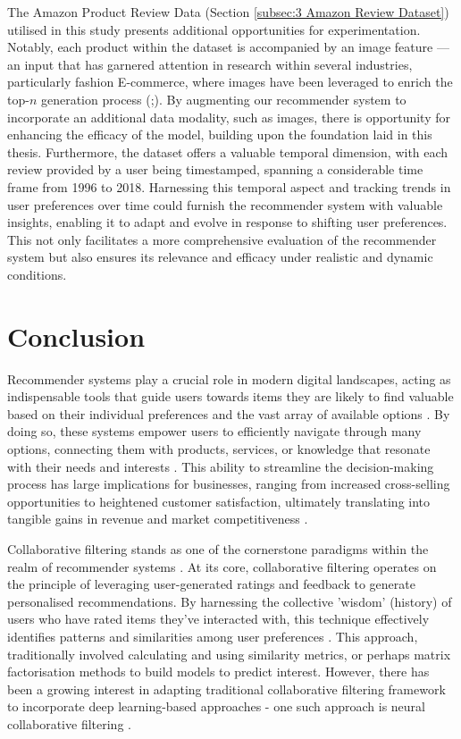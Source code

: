 The Amazon Product Review Data (Section \ref{subsec:3 Amazon Review Dataset}) utilised in this study presents additional opportunities for experimentation. Notably, each product within the dataset is accompanied by an image feature — an input that has garnered attention in research within several industries, particularly fashion E-commerce, where images have been leveraged to enrich the top-$n$ generation process (\cite{tuinhof2019image};\cite{kurt2017image}). By augmenting our recommender system to incorporate an additional data modality, such as images, there is opportunity for enhancing the efficacy of the model, building upon the foundation laid in this thesis. Furthermore, the dataset offers a valuable temporal dimension, with each review provided by a user being timestamped, spanning a considerable time frame from 1996 to 2018. Harnessing this temporal aspect and tracking trends in user preferences over time could furnish the recommender system with valuable insights, enabling it to adapt and evolve in response to shifting user preferences. This not only facilitates a more comprehensive evaluation of the recommender system but also ensures its relevance and efficacy under realistic and dynamic conditions. 

\section{Conclusion}
\label{sec:6 Conclusion for Conclusion}


Recommender systems play a crucial role in modern digital landscapes, acting as indispensable tools that guide users towards items they are likely to find valuable based on their individual preferences and the vast array of available options \cite{jannach2010recommender}. By doing so, these systems empower users to efficiently navigate through many options, connecting them with products, services, or knowledge that resonate with their needs and interests \cite{jannach2010recommender}. This ability to streamline the decision-making process has large implications for businesses, ranging from increased cross-selling opportunities to heightened customer satisfaction, ultimately translating into tangible gains in revenue and market competitiveness \cite{leino2007case}.

Collaborative filtering stands as one of the cornerstone paradigms within the realm of recommender systems \cite{burke2015robust}. At its core, collaborative filtering operates on the principle of leveraging user-generated ratings and feedback to generate personalised recommendations. By harnessing the collective 'wisdom' (history) of users who have rated items they've interacted with, this technique effectively identifies patterns and similarities among user preferences \cite{burke2015robust}. This approach, traditionally involved calculating and using similarity metrics, or perhaps matrix factorisation methods to build models to predict interest. However, there has been a growing interest in adapting traditional collaborative filtering framework to incorporate deep learning-based approaches - one such approach is neural collaborative filtering \cite{he2017neural}.



